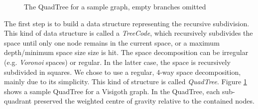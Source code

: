 \documentclass[a4paper,11pt,titlepage]{article}
\begin{document}
\begin{figure}
  \centering
  \hspace{10pt}
  \caption{The QuadTree for a sample graph, empty branches omitted}
  \label{fig:quadtree}
\end{figure}

The first step is to build a data structure representing the recursive subdivision. This
kind of data structure is called a \emph{TreeCode}, which recursively subdivides the space
until only one node remains in the current space, or a maximum depth/minimum space size
size is hit. The space decomposition can be irregular (e.g. \emph{Voronoi} spaces) or
regular. In the latter case, the space is recursively subdivided in squares. We chose to
use a regular, 4-way space decomposition, mainly due to its simplicity. This kind of
structure is called \emph{QuadTree}. Figure \ref{fig:quadtree} shows a sample QuadTree for
a Visigoth graph. In the QuadTree, each sub-quadrant preserved the weighted centre of
gravity relative to the contained nodes.
\end{document}
